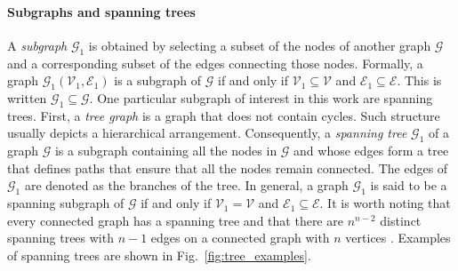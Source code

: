 \paragraph*{Subgraphs and spanning trees}
A \emph{subgraph} $\mathcal{G}_1$ is obtained by selecting a subset of the nodes of another graph $\mathcal{G}$ and a corresponding subset of the edges connecting those nodes. Formally, a graph $\mathcal{G}_1\left(\mathcal{V}_1, \mathcal{E}_1\right)$ is a subgraph of $\mathcal{G}$ if and only if $\mathcal{V}_1 \subseteq  \mathcal{V}$ and $\mathcal{E}_1 \subseteq \mathcal{E}$. This is written $\mathcal{G}_1 \subseteq \mathcal{G}$. One particular subgraph of interest in this work are spanning trees. First, a \emph{tree graph} is a graph that does not contain cycles. Such structure usually depicts a hierarchical arrangement. Consequently, a \emph{spanning tree} $\mathcal{G}_1$ of a graph $\mathcal{G}$ is a subgraph containing all the nodes in $\mathcal{G}$ and whose edges form a tree that defines paths that ensure that all the nodes remain connected. The edges of $\mathcal{G}_1$ are denoted as the branches of the tree. In general, a graph $\mathcal{G}_1$ is said to be a spanning subgraph of $\mathcal{G}$ if and only if $\mathcal{V}_1 = \mathcal{V}$ and $\mathcal{E}_1 \subseteq \mathcal{E}$. It is worth noting that every connected graph has a spanning tree and that there are $n^{n-2}$ distinct spanning trees with $n - 1$ edges on a connected graph with $n$ vertices \cite{West2001Introductiongraphtheory}. Examples of spanning trees are shown in Fig.~\ref{fig:tree_examples}.


